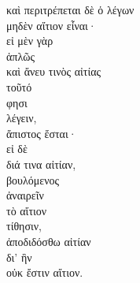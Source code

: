 {\large
\begin{greek}
\noindent  καὶ περιτρέπεται δὲ ὁ λέγων \\
\tabto{2em} μηδὲν αἴτιον εἶναι· \\
\tabto{4em} εἰ μὲν γὰρ \\
\tabto{6em} ἁπλῶς \\
\tabto{6em} καὶ ἄνευ τινὸς αἰτίας \\
\tabto{6em} τοῦτό \\
\tabto{4em} φησι \\
\tabto{6em} λέγειν, \\
\tabto{4em} ἄπιστος ἔσται· \\

\tabto{4em} εἰ δὲ \\
\tabto{6em} διά τινα αἰτίαν, \\
\tabto{4em} βουλόμενος \\
\tabto{6em} ἀναιρεῖν \\
\tabto{6em} τὸ αἴτιον \\
\tabto{4em} τίθησιν, \\
\tabto{4em} ἀποδιδόσθω αἰτίαν \\
\tabto{6em} δι’ ἣν \\
\tabto{8em} οὐκ ἔστιν αἴτιον.\\

\end{greek}
}

